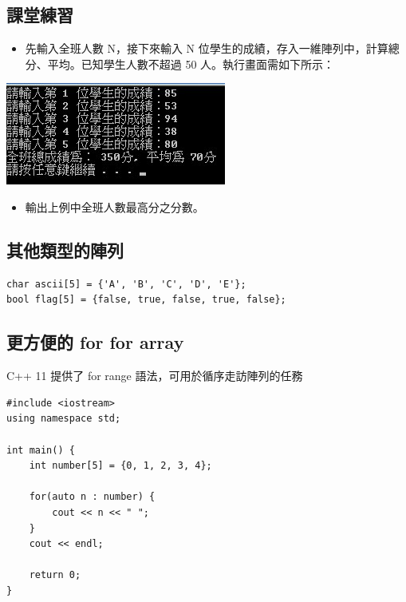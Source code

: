 \documentclass[a4paper,12pt]{article}
\begin{document}
\subsection{課堂練習}
\label{sec:orga16e096}
\begin{itemize}
\item 先輸入全班人數 N，接下來輸入 N 位學生的成績，存入一維陣列中，計算總分、平均。已知學生人數不超過 50 人。執行畫面需如下所示：\\
\end{itemize}
\begin{center}
\includegraphics[width=.9\linewidth]{images/array-3.jpg}
\end{center}
\begin{itemize}
\item 輸出上例中全班人數最高分之分數。\\
\end{itemize}

\subsection{其他類型的陣列}
\label{sec:orgf288421}
\lstset{breaklines=true,language=cpp,label= ,caption= ,captionpos=b,firstnumber=1,numbers=left}
\begin{lstlisting}
char ascii[5] = {'A', 'B', 'C', 'D', 'E'};
bool flag[5] = {false, true, false, true, false};
\end{lstlisting}

\subsection{更方便的 for for array}
\label{sec:org72e01fd}
C++ 11 提供了 for range 語法，可用於循序走訪陣列的任務\\
\lstset{breaklines=true,language=cpp,label= ,caption= ,captionpos=b,firstnumber=1,numbers=left}
\begin{lstlisting}
#include <iostream>
using namespace std;

int main() {
    int number[5] = {0, 1, 2, 3, 4};

    for(auto n : number) {
        cout << n << " ";
    }
    cout << endl;

    return 0;
}
\end{lstlisting}
\end{document}
